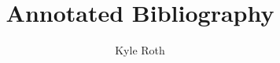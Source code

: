 \documentclass[11pt]{article}
\author{Kyle Roth}
\title{Annotated Bibliography}
\begin{document}
\maketitle

\nocite{*}



\end{document}
